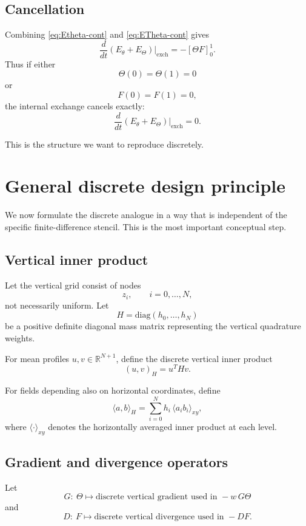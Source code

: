 \documentclass[11pt]{article}
\begin{document}
\subsection{Cancellation}

Combining \eqref{eq:Etheta-cont} and \eqref{eq:ETheta-cont} gives
\[
\frac{d}{dt}(E_\theta + E_\Theta)\Big|_{\mathrm{exch}}
=
-
\left[\Theta F\right]_{0}^{1}.
\]
Thus if either
\[
\Theta(0)=\Theta(1)=0
\]
or
\[
F(0)=F(1)=0,
\]
the internal exchange cancels exactly:
\begin{equation}
\frac{d}{dt}(E_\theta + E_\Theta)\Big|_{\mathrm{exch}} = 0.
\label{eq:continuous-exchange-cancel}
\end{equation}

This is the structure we want to reproduce discretely.

\section{General discrete design principle}

We now formulate the discrete analogue in a way that is independent of the specific finite-difference stencil. This is the most important conceptual step.

\subsection{Vertical inner product}

Let the vertical grid consist of nodes
\[
z_i, \qquad i=0,\dots,N,
\]
not necessarily uniform. Let
\[
H = \mathrm{diag}(h_0,\dots,h_N)
\]
be a positive definite diagonal mass matrix representing the vertical quadrature weights.

For mean profiles $u,v\in\mathbb R^{N+1}$, define the discrete vertical inner product
\[
(u,v)_H = u^T H v.
\]

For fields depending also on horizontal coordinates, define
\[
\langle a,b\rangle_H
=
\sum_{i=0}^N h_i\,\langle a_i b_i\rangle_{xy},
\]
where $\langle\cdot\rangle_{xy}$ denotes the horizontally averaged inner product at each level.

\subsection{Gradient and divergence operators}

Let
\[
G:\ \Theta \mapsto \text{discrete vertical gradient used in } -w\,G\Theta
\]
and
\[
D:\ F \mapsto \text{discrete vertical divergence used in } -D F.
\]
\end{document}
